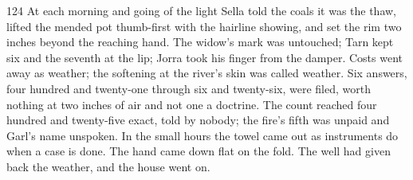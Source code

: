 \begin{CRchronicle}{124}
At each morning and going of the light Sella told the coals it was the thaw, lifted the mended pot thumb-first with the hairline showing, and set the rim two inches beyond the reaching hand. The widow’s mark was untouched; Tarn kept six and the seventh at the lip; Jorra took his finger from the damper. Costs went away as weather; the softening at the river’s skin was called weather. Six answers, four hundred and twenty-one through six and twenty-six, were filed, worth nothing at two inches of air and not one a doctrine. The count reached four hundred and twenty-five exact, told by nobody; the fire’s fifth was unpaid and Garl’s name unspoken. In the small hours the towel came out as instruments do when a case is done. The hand came down flat on the fold. The well had given back the weather, and the house went on.
\end{CRchronicle}
